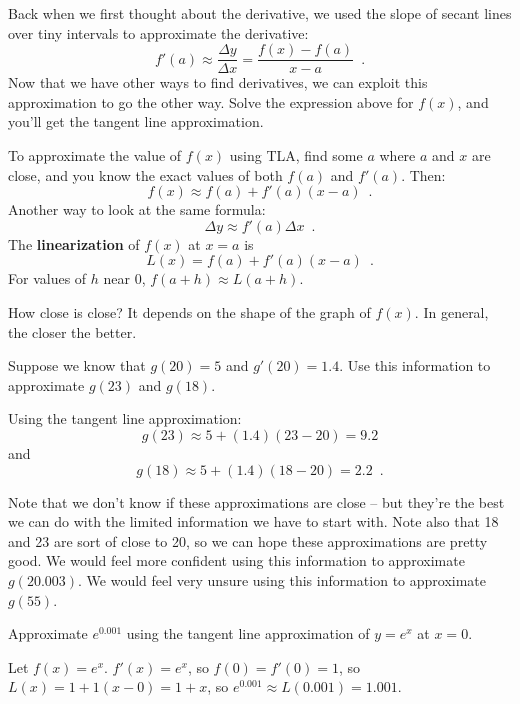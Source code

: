 Back when we first thought about the derivative, we used the slope of secant lines over tiny intervals to approximate the derivative:
$$f'(a)\approx  \dfrac{\Delta y}{\Delta x} = \dfrac{f(x)-f(a)}{x-a} \enspace .$$
Now that we have other ways to find derivatives, we can exploit this approximation to go the other way. Solve the expression above for $f(x)$, and you'll get the tangent line approximation.

\begin{definition}
To approximate the value of $f(x)$ using TLA, find some $a$ where $a$ and $x$ are close, and you know the exact values of both $f(a)$ and $f'(a)$. Then:
$$f(x)\approx   f(a)+f'(a)(x-a) \enspace .$$
Another way to look at the same formula:
$$\Delta y\approx   f'(a)\Delta x \enspace .$$
The {\bf linearization} of $f(x)$ at $x=a$ is 
$$L(x) = f(a) + f'(a)(x-a) \enspace .$$
For values of $h$ near 0, $f(a+h) \approx L(a+h)$.

\end{definition}

How close is close? It depends on the shape of the graph of $f(x)$. In general, the closer the better.

\begin{example}
Suppose we know that $g(20)=5$ and $g'(20)=1.4$. Use this information to approximate $g(23)$ and $g(18)$.

\begin{solution} Using the tangent line approximation:
$$g(23)\approx 5+(1.4)(23-20)=9.2$$
and
$$g(18)\approx 5+(1.4)(18-20)=2.2 \enspace .$$
\end{solution}\end{example}
Note that we don't know if these approximations are close – but they're the best we can do with the limited information we have to start with. Note also that 18 and 23 are sort of close to 20, so we can hope these approximations are pretty good. We would feel more confident using this information to approximate $g(20.003)$. We would feel very unsure using this information to approximate $g(55)$.

\begin{example} Approximate $e^{0.001}$ using the tangent line approximation of $y=e^x$ at $x=0$.
\begin{solution}  Let $f(x) = e^x$. $f'(x) = e^x$, so $f(0) = f'(0) = 1$, so $L(x) = 1 + 1(x-0) = 1+x$, so $e^{0.001} \approx L(0.001) = 1.001$.
\end{solution}
\end{example}

